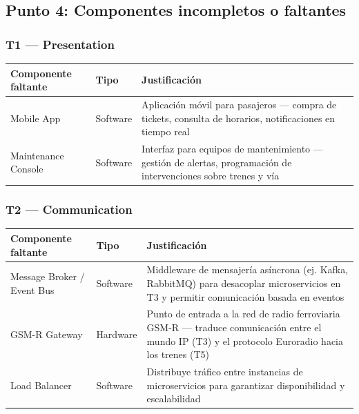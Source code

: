 \documentclass[a4paper, 10 pt]{article}
\begin{document}
\subsection{Punto 4: Componentes incompletos o faltantes}

\subsubsection{T1 --- Presentation}

\begin{table}[H]
\centering
\footnotesize
\begin{tabular}{|R{0.18\textwidth}|M{0.1\textwidth}|R{0.52\textwidth}|}
\hline
\textbf{Componente faltante} & \textbf{Tipo} & \textbf{Justificación} \\
\hline
Mobile App & Software & Aplicación móvil para pasajeros --- compra de tickets, consulta de horarios, notificaciones en tiempo real \\
\hline
Maintenance Console & Software & Interfaz para equipos de mantenimiento --- gestión de alertas, programación de intervenciones sobre trenes y vía \\
\hline
\end{tabular}
\end{table}

\subsubsection{T2 --- Communication}

\begin{table}[H]
\centering
\footnotesize
\begin{tabular}{|R{0.18\textwidth}|M{0.1\textwidth}|R{0.52\textwidth}|}
\hline
\textbf{Componente faltante} & \textbf{Tipo} & \textbf{Justificación} \\
\hline
Message Broker / Event Bus & Software & Middleware de mensajería asíncrona (ej. Kafka, RabbitMQ) para desacoplar microservicios en T3 y permitir comunicación basada en eventos \\
\hline
GSM-R Gateway & Hardware & Punto de entrada a la red de radio ferroviaria GSM-R --- traduce comunicación entre el mundo IP (T3) y el protocolo Euroradio hacia los trenes (T5) \\
\hline
Load Balancer & Software & Distribuye tráfico entre instancias de microservicios para garantizar disponibilidad y escalabilidad \\
\hline
\end{tabular}
\end{table}
\end{document}
